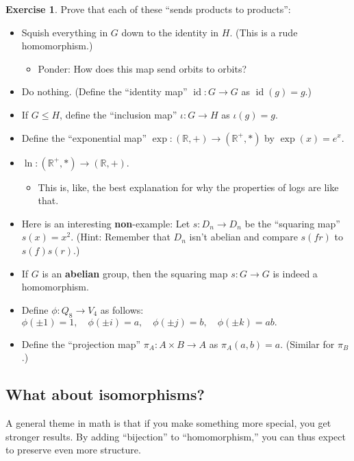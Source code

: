 \documentclass[12pt]{article}
\theoremstyle{definition} %
\newtheorem*{exercise}{Exercise}
\newcommand{\R}{\mathbb{R}}
\DeclareMathOperator{\id}{id}
\begin{document}
\begin{exercise} Prove that each of these ``sends products to products'':
    \begin{itemize}
        \item Squish everything in $G$ down to the identity in $H$. (This is a rude homomorphism.)
        \begin{itemize}
            \item Ponder: How does this map send orbits to orbits?
        \end{itemize}
        \item Do nothing. (Define the ``identity map'' $\id:G\to G$ as $\id(g) = g$.)
        \item If $G \leq H$, define the ``inclusion map'' $\iota:G\to H$ as $\iota(g) = g$.
        \item Define the ``exponential map'' $\exp:(\R, +) \to (\R^+, *)$ by $\exp(x) = e^x$.
        \item $\ln:(\R^+, *) \to (\R, +)$.
        \begin{itemize}
            \item This is, like, the best explanation for why the properties of logs are like that.
        \end{itemize}
        \item Here is an interesting \textbf{non}-example: Let $s:D_n \to D_n$ be the ``squaring map'' $s(x) = x^2$. (Hint: Remember that $D_n$ isn't abelian and compare $s(fr)$ to $s(f) s(r)$.)
        \item If $G$ is an \textbf{abelian} group, then the squaring map $s:G\to G$ is indeed a homomorphism.
        \item Define $\phi:Q_8 \to V_4$ as follows: $\phi(\pm 1) = 1, \quad \phi(\pm i) = a, \quad \phi(\pm j) = b, \quad \phi(\pm k) = ab.$
        \item Define the ``projection map'' $\pi_A:A\times B \to A$ as $\pi_A(a,b) = a$. (Similar for $\pi_B$.)
    \end{itemize}
\end{exercise}

\subsection*{What about isomorphisms?}
A general theme in math is that if you make something more special, you get stronger results. By adding ``bijection'' to ``homomorphism,'' you can thus expect to preserve even more structure.
\end{document}
